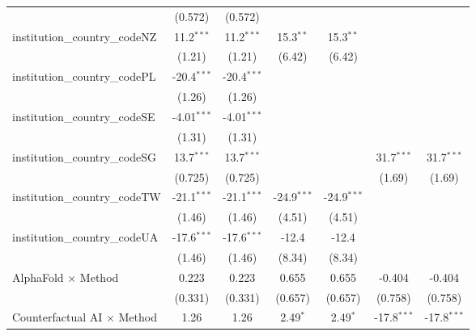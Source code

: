 \begin{tabular}{lcccccc}
                                         & (0.572)       & (0.572)       &               &               &               &   \\   
   institution\_country\_codeNZ          & 11.2$^{***}$  & 11.2$^{***}$  & 15.3$^{**}$   & 15.3$^{**}$   &               &   \\   
                                         & (1.21)        & (1.21)        & (6.42)        & (6.42)        &               &   \\   
   institution\_country\_codePL          & -20.4$^{***}$ & -20.4$^{***}$ &               &               &               &   \\   
                                         & (1.26)        & (1.26)        &               &               &               &   \\   
   institution\_country\_codeSE          & -4.01$^{***}$ & -4.01$^{***}$ &               &               &               &   \\   
                                         & (1.31)        & (1.31)        &               &               &               &   \\   
   institution\_country\_codeSG          & 13.7$^{***}$  & 13.7$^{***}$  &               &               & 31.7$^{***}$  & 31.7$^{***}$\\   
                                         & (0.725)       & (0.725)       &               &               & (1.69)        & (1.69)\\   
   institution\_country\_codeTW          & -21.1$^{***}$ & -21.1$^{***}$ & -24.9$^{***}$ & -24.9$^{***}$ &               &   \\   
                                         & (1.46)        & (1.46)        & (4.51)        & (4.51)        &               &   \\   
   institution\_country\_codeUA          & -17.6$^{***}$ & -17.6$^{***}$ & -12.4         & -12.4         &               &   \\   
                                         & (1.46)        & (1.46)        & (8.34)        & (8.34)        &               &   \\   
   AlphaFold $\times$ Method             & 0.223         & 0.223         & 0.655         & 0.655         & -0.404        & -0.404\\   
                                         & (0.331)       & (0.331)       & (0.657)       & (0.657)       & (0.758)       & (0.758)\\   
   Counterfactual AI $\times$ Method     & 1.26          & 1.26          & 2.49$^{*}$    & 2.49$^{*}$    & -17.8$^{***}$ & -17.8$^{***}$\\   

\end{tabular}
